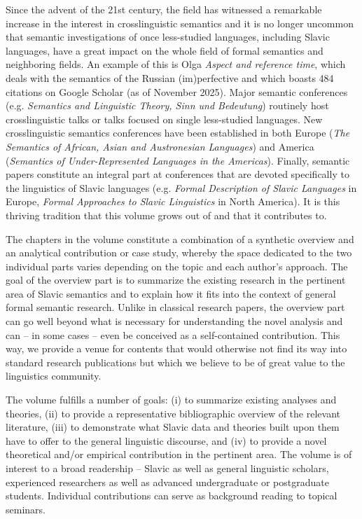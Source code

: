 \documentclass[output=paper,colorlinks,citecolor=brown]{langscibook}
\begin{document}
Since the advent of the 21st century, the field has witnessed a remarkable increase in the interest in crosslinguistic semantics and it is no longer uncommon that semantic investigations of once less-studied languages, including Slavic languages, have a great impact on the whole field of formal semantics and neighboring fields. An example of this is Olga  \emph{Aspect and reference time}, which deals with the semantics of the Russian (im)perfective and which boasts 484 citations on Google Scholar (as of November 2025). %
Major semantic conferences (e.g. \emph{Semantics and Linguistic Theory, Sinn und Bedeutung}) routinely host crosslinguistic talks or talks focused on single less-studied languages. New crosslinguistic semantics conferences have been established in both Europe (\emph{The Semantics of African, Asian and Austronesian Languages}) and America (\emph{Semantics of Under-Represented Languages in the Americas}). Finally, semantic papers constitute an integral part at conferences that are devoted specifically to the linguistics of Slavic languages (e.g. \emph{Formal Description of Slavic Languages} in Europe, \emph{Formal Approaches to Slavic Linguistics} in North America). It is this thriving tradition that this volume grows out of and that it contributes to.

The chapters in the volume constitute a combination of a synthetic overview and an analytical contribution or case study, whereby the space dedicated to the two individual parts varies depending on the topic and each author's approach. The goal of the overview part is to summarize the existing research in the pertinent area of Slavic semantics and to explain how it fits into the context of general formal semantic research. Unlike in classical research papers, the overview part can go well beyond what is necessary for understanding the novel analysis and can -- in some cases -- even be conceived as a self-contained contribution. This way, we provide a venue for contents that would otherwise not find its way into standard research publications but which we believe to be of great value to the linguistics community.

The volume fulfills a number of goals: (i) to summarize existing analyses and theories, (ii) to provide a representative bibliographic overview of the relevant literature, (iii) to demonstrate what Slavic data and theories built upon them have to offer to the general linguistic discourse, and (iv) to provide a novel theoretical and/or empirical contribution in the pertinent area. The volume is of interest to a broad readership -- Slavic as well as general linguistic scholars, experienced researchers as well as advanced undergraduate or postgraduate students. Individual contributions can serve as background reading to topical seminars.
\end{document}
